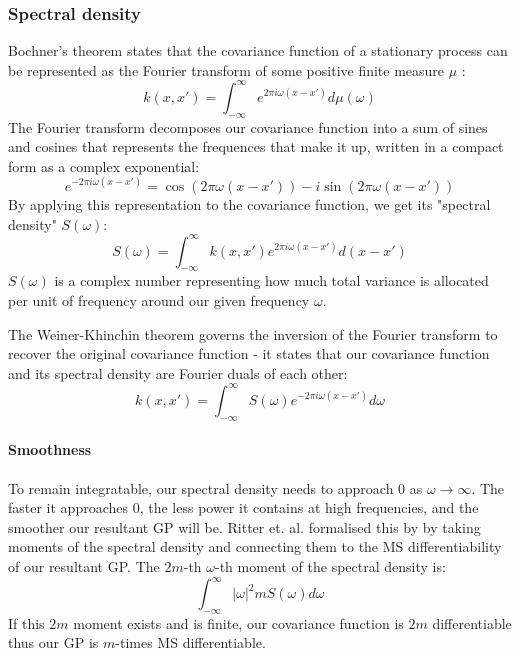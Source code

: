 \subsubsection{Spectral density}
Bochner's theorem states that the covariance function of a stationary process can be represented as the Fourier transform of some positive finite measure $\mu$ \cite{Gikhman2004-wc}:
\begin{equation*}
    k(x, x') = \int_{-\infty}^{\infty} e^{2\pi i \omega (x - x')} d\mu(\omega)
\end{equation*}
The Fourier transform decomposes our covariance function into a sum of sines and cosines that represents the frequences that make it up, written in a compact form as a complex exponential:
\begin{equation*}
    e^{-2\pi i \omega (x - x')} = \cos(2\pi \omega (x - x')) - i \sin(2\pi \omega (x - x'))
\end{equation*}
By applying this representation to the covariance function, we get its "spectral density" $S(\omega)$:
\begin{equation*}
    S(\omega) = \int_{-\infty}^{\infty} k(x, x') e^{2\pi i \omega (x - x')} d(x - x')
\end{equation*}
$S(\omega)$ is a complex number representing how much total variance is allocated per unit of frequency around our given frequency $\omega$. 

The Weiner-Khinchin theorem governs the inversion of the Fourier transform to recover the original covariance function - it states that our covariance function and its spectral density are Fourier duals of each other: 
\begin{equation*}
    k(x, x') = \int_{-\infty}^{\infty} S(\omega) e^{-2\pi i \omega (x - x')} d\omega
\end{equation*}

\paragraph{Smoothness}
To remain integratable, our spectral density needs to approach $0$ as $\omega \to \infty$. The faster it approaches $0$, the less power it contains at high frequencies, and the smoother our resultant GP will be. Ritter et. al. \cite{fourier_moments} formalised this by by taking moments of the spectral density and connecting them to the MS differentiability of our resultant GP. The $2m$-th $\omega$-th moment of the spectral density is:
\begin{equation*}
    \int_{-\infty}^{\infty} |\omega|^2m S(\omega) d\omega
\end{equation*}
If this $2m$ moment exists and is finite, our covariance function is $2m$ differentiable thus our GP is $m$-times MS differentiable. 


